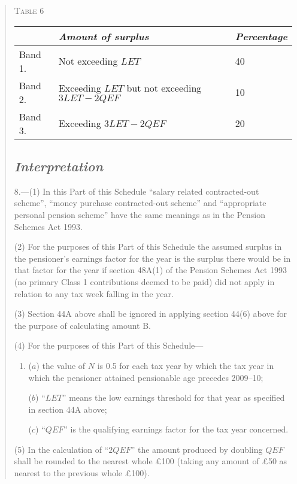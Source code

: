 \documentclass[12pt,a4paper]{article}
\begin{document}
\begin{quotation}
\noindent\textsc{Table 6}

{\noindent\footnotesize
\begin{longtable}{lll}
\hline
&\itshape Amount of surplus	&\itshape Percentage\\
\hline
\endhead
\hline
\endlastfoot
Band 1. 	&Not exceeding $LET$	&40\\
Band 2. 	&Exceeding $LET$ but not exceeding $3LET - 2QEF$	&10\\
Band 3. 	&Exceeding $3LET - 2QEF$	&20\\
\end{longtable}

}

\subsection*{\itshape Interpretation}

8.---(1) In this Part of this Schedule “salary related contracted-out scheme”, “money purchase contracted-out scheme” and “appropriate personal pension scheme” have the same meanings as in the Pension Schemes Act 1993. 

(2) For the purposes of this Part of this Schedule the assumed surplus in the pensioner’s earnings factor for the year is the surplus there would be in that factor for the year if section 48A(1)  of the Pension Schemes Act 1993 (no primary Class 1 contributions deemed to be paid) did not apply in relation to any tax week falling in the year.

(3) Section 44A above shall be ignored in applying section 44(6)  above for the purpose of calculating amount B.

(4) For the purposes of this Part of this Schedule—
\begin{enumerate}\item[]
($a$) the value of $N$ is 0.5 for each tax year by which the tax year in which the pensioner attained pensionable age precedes 2009--10;

($b$) “$LET$” means the low earnings threshold for that year as specified in section 44A above;

($c$) “$QEF$” is the qualifying earnings factor for the tax year concerned.
\end{enumerate}

(5) In the calculation of “$2QEF$” the amount produced by doubling $QEF$ shall be rounded to the nearest whole £100 (taking any amount of £50 as nearest to the previous whole £100).


\end{quotation}
\end{document}
